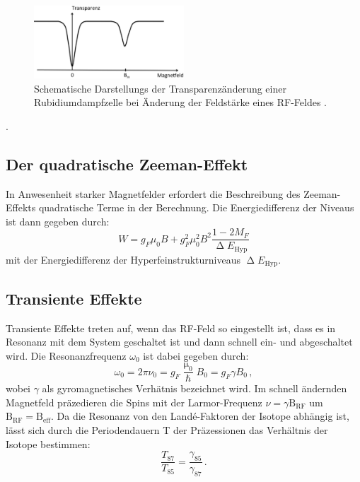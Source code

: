 \begin{figure}
  \centering
  \includegraphics[width=0.5\textwidth]{Bilder/Beispiel}
  \caption{Schematische Darstellungs der Transparenzänderung einer Rubidiumdampfzelle bei Änderung der Feldstärke eines RF-Feldes \cite{anleitung}.}
  \label{Kreislauf}
\end{figure}.
\subsection{Der quadratische Zeeman-Effekt}
In Anwesenheit starker Magnetfelder erfordert die Beschreibung des Zeeman-Effekts quadratische Terme in der Berechnung. Die Energiedifferenz der Niveaus ist dann gegeben durch:
\begin{equation}
  W = g_F\mu_\text{0}B+g^2_F\mu^2_\text{0}B^2\frac{1-2M_F}{\upDelta E_\text{Hyp}}
  \label{eq:quadratisch}
\end{equation}
mit der Energiedifferenz der Hyperfeinstrukturniveaus $\upDelta E_\text{Hyp}$.
\subsection{Transiente Effekte}
Transiente Effekte treten auf, wenn das RF-Feld so eingestellt ist, dass es in Resonanz mit dem System geschaltet ist und dann schnell ein- und abgeschaltet wird. Die Resonanzfrequenz $\omega_0$ ist dabei gegeben durch:
\begin{equation}
\omega_0=2\pi\nu_0=g_F\frac{\upmu_0}{\hbar}B_0=g_F\gamma B_0\,,
\end{equation}
wobei $\gamma$ als gyromagnetisches Verhätnis bezeichnet wird. Im schnell ändernden Magnetfeld präzedieren die Spins mit der Larmor-Frequenz $\nu=\gamma\text{B}_\text{RF}$ um $\text{B}_\text{RF}=\text{B}_\text{eff}$. Da die Resonanz von den Landé-Faktoren der Isotope abhängig ist, lässt sich durch die Periodendauern T der Präzessionen das Verhältnis der Isotope bestimmen:
\begin{equation}
  \frac{T_{87}}{T_{85}}=\frac{\gamma_{85}}{\gamma_{87}}\,.
\end{equation}
